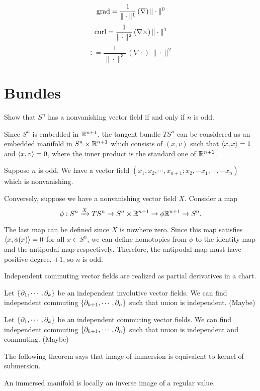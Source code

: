 \documentclass[12pt]{article}
\begin{document}
\bigskip

\[\operatorname{grad}=\frac1{\|\cdot\|^1}\,(\nabla)\,\|\cdot\|^0\]
\[\operatorname{curl}=\frac1{\|\cdot\|^2}\,(\nabla\times)\,\|\cdot\|^1\]
\[\div=\frac1{\|\cdot\|^3}\,(\nabla\cdot)\,\|\cdot\|^2\]




\section{Bundles}
Show that $S^n$ has a nonvanishing vector field if and only if $n$ is odd.
\begin{sol}
Since $S^n$ is embedded in $\mathbb{R}^{n+1}$, the tangent bundle $TS^n$ can be considered as an embedded manifold in $S^n\times\mathbb{R}^{n+1}$ which consists of $(x,v)$ such that $\langle x,x\rangle=1$ and $\langle x,v\rangle=0$, where the inner product is the standard one of $\mathbb{R}^{n+1}$.

Suppose $n$ is odd.
We have a vector field
$(x_1,x_2,\cdots,x_{n+1};x_2,-x_1,\cdots,-x_n)$
which is nonvanishing.

Conversely, suppose we have a nonvanishing vector field $X$.
Consider a map
\[\phi:S^n\xrightarrow{X}TS^n\to S^n\times\mathbb{R}^{n+1}\to{\phi}\mathbb{R}^{n+1}\to S^n.\]

The last map can be defined since $X$ is nowhere zero. Since this map satisfies $\langle x,\phi(x)\rangle=0$ for all $x\in S^n$, we can define homotopies from $\phi$ to the identity map and the antipodal map respectively. Therefore, the antipodal map must have positive degree, $+1$, so $n$ is odd.
\end{sol}


\begin{prop}
Independent commuting vector fields are realized as partial derivatives in a chart.
\end{prop}

\begin{prop}
Let $\{\pd_1,\cdots,\pd_k\}$ be an independent involutive vector fields.
We can find independent commuting $\{\pd_{k+1},\cdots,\pd_n\}$ such that union is independent.
(Maybe)
\end{prop}
\begin{prop}
Let $\{\pd_1,\cdots,\pd_k\}$ be an independent commuting vector fields.
We can find independent commuting $\{\pd_{k+1},\cdots,\pd_n\}$ such that union is independent and commuting.
(Maybe)
\end{prop}

\bigskip



The following theorem says that image of immersion is equivalent to kernel of submersion.
\begin{prop}
An immersed manifold is locally an inverse image of a regular value.
\end{prop}
\end{document}
